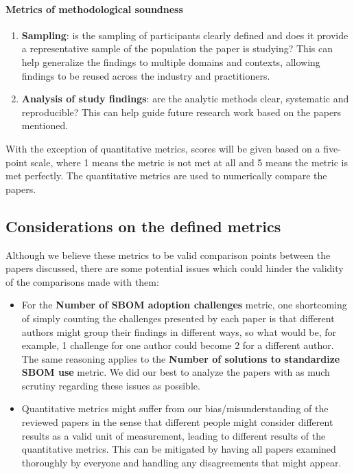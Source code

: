\paragraph{Metrics of methodological soundness}
\begin{enumerate}
    \setcounter{enumi}{\value{metrics}}
    \item \textbf{Sampling}: is the sampling of participants clearly defined and does it provide a representative sample of the population the paper is studying? This can help generalize the findings to multiple domains and contexts, allowing findings to be reused across the industry and practitioners.
    \item \textbf{Analysis of study findings}: are the analytic methods clear, systematic and reproducible? This can help guide future research work based on the papers mentioned.
          \setcounter{metrics}{\value{enumi}}
\end{enumerate}


With the exception of quantitative metrics, scores will be given based on a five-point scale, where 1 means the metric is not met at all and 5 means the metric is met perfectly. The quantitative metrics are used to numerically compare the papers.

\subsection{Considerations on the defined metrics}

Although we believe these metrics to be valid comparison points between the papers discussed, there are some potential issues which could hinder the validity of the comparisons made with them:
\begin{itemize}
    \item For the \textbf{Number of SBOM adoption challenges} metric, one shortcoming of simply counting the challenges presented by each paper is that different authors might group their findings in different ways, so what would be, for example, 1 challenge for one author could become 2 for a different author. The same reasoning applies to the \textbf{Number of solutions to standardize SBOM use} metric. We did our best to analyze the papers with as much scrutiny regarding these issues as possible.
    \item Quantitative metrics might suffer from our bias/misunderstanding of the reviewed papers in the sense that different people might consider different results as a valid unit of measurement, leading to different results of the quantitative metrics. This can be mitigated by having all papers examined thoroughly by everyone and handling any disagreements that might appear.
\end{itemize}